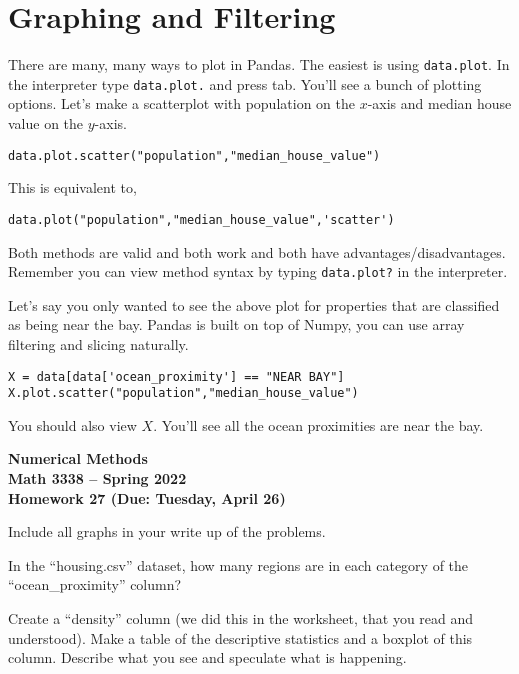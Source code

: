 \documentclass[11pt,letterpaper]{article}
\newcommand{\semester}{Spring 2022}
\newcommand{\due}{Tuesday, April 26}
\begin{document}
\section{Graphing and Filtering}
There are many, many ways to plot in Pandas. The easiest is using \texttt{data.plot}. In the
interpreter type \texttt{data.plot.} and press tab. You'll see a bunch of plotting options. 
Let's make a scatterplot with population on the $x$-axis and median house value on the 
$y$-axis.
\begin{verbatim}
data.plot.scatter("population","median_house_value")
\end{verbatim}
This is equivalent to,
\begin{verbatim}
data.plot("population","median_house_value",'scatter')
\end{verbatim}
Both methods are valid and both work and both have advantages/disadvantages. Remember you can
view method syntax by typing \texttt{data.plot?} in the interpreter. 


Let's say you only wanted to see the above plot for properties that are classified as being 
near the bay. Pandas is built on top of Numpy, you can use array filtering and slicing naturally.
\begin{verbatim}
X = data[data['ocean_proximity'] == "NEAR BAY"]
X.plot.scatter("population","median_house_value")
\end{verbatim}
You should also view $X$. You'll see all the ocean proximities are near the bay.




\newpage

\begin{center}
{\huge{\bf  Numerical Methods}} \\[1.5ex]
{\bf Math 3338 -- \semester}\\[1.5ex]
{\Large{\bf Homework 27 (Due: \due)}}\\
\end{center}
\vspace{2mm}

Include all graphs in your write up of the problems.

\begin{problem}
In the ``housing.csv'' dataset, how many regions are in each category of the ``ocean\_proximity'' 
column?
\end{problem}


\begin{problem}
Create a ``density'' column (we did this in the worksheet, that you read and understood). Make
a table of the descriptive statistics and a boxplot of this column. Describe what you see
and speculate what is happening. 
\end{problem}
\end{document}
